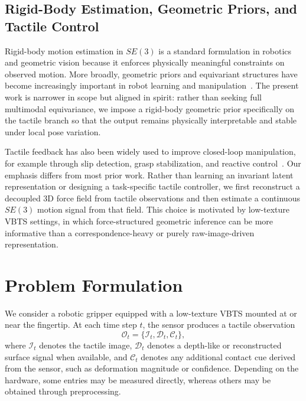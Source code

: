 \documentclass[letterpaper,10pt,journal,twoside]{IEEEtran}
\begin{document}
\subsection{Rigid-Body Estimation, Geometric Priors, and Tactile Control}
Rigid-body motion estimation in $SE(3)$ is a standard formulation in robotics and geometric vision because it enforces physically meaningful constraints on observed motion. More broadly, geometric priors and equivariant structures have become increasingly important in robot learning and manipulation~\cite{thomas2018tensor,seo2025equicontact,zhu2025residual}. The present work is narrower in scope but aligned in spirit: rather than seeking full multimodal equivariance, we impose a rigid-body geometric prior specifically on the tactile branch so that the output remains physically interpretable and stable under local pose variation.

Tactile feedback has also been widely used to improve closed-loop manipulation, for example through slip detection, grasp stabilization, and reactive control~\cite{xue2025reactive,bogert2024builtdifferent}. Our emphasis differs from most prior work. Rather than learning an invariant latent representation or designing a task-specific tactile controller, we first reconstruct a decoupled 3D force field from tactile observations and then estimate a continuous $SE(3)$ motion signal from that field. This choice is motivated by low-texture VBTS settings, in which force-structured geometric inference can be more informative than a correspondence-heavy or purely raw-image-driven representation.

\section{Problem Formulation}
\label{sec:problem}

We consider a robotic gripper equipped with a low-texture VBTS mounted at or near the fingertip. At each time step $t$, the sensor produces a tactile observation
\begin{equation}
\mathcal{O}_t = \{ \mathcal{I}_t, \mathcal{D}_t, \mathcal{C}_t \},
\end{equation}
where $\mathcal{I}_t$ denotes the tactile image, $\mathcal{D}_t$ denotes a depth-like or reconstructed surface signal when available, and $\mathcal{C}_t$ denotes any additional contact cue derived from the sensor, such as deformation magnitude or confidence. Depending on the hardware, some entries may be measured directly, whereas others may be obtained through preprocessing.
\end{document}
